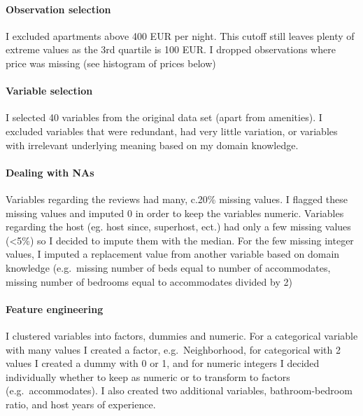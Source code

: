 \documentclass[
]{article}
\begin{document}
\hypertarget{observation-selection}{%
\paragraph{Observation selection}\label{observation-selection}}

I excluded apartments above 400 EUR per night. This cutoff still leaves
plenty of extreme values as the 3rd quartile is 100 EUR. I dropped
observations where price was missing (see histogram of prices below)

\hypertarget{variable-selection}{%
\paragraph{Variable selection}\label{variable-selection}}

I selected 40 variables from the original data set (apart from
amenities). I excluded variables that were redundant, had very little
variation, or variables with irrelevant underlying meaning based on my
domain knowledge.

\hypertarget{dealing-with-nas}{%
\paragraph{Dealing with NAs}\label{dealing-with-nas}}

Variables regarding the reviews had many, c.20\% missing values. I
flagged these missing values and imputed 0 in order to keep the
variables numeric. Variables regarding the host (eg. host since,
superhost, ect.) had only a few missing values (\textless5\%) so I
decided to impute them with the median. For the few missing integer
values, I imputed a replacement value from another variable based on
domain knowledge (e.g.~missing number of beds equal to number of
accommodates, missing number of bedrooms equal to accommodates divided
by 2)

\hypertarget{feature-engineering}{%
\paragraph{Feature engineering}\label{feature-engineering}}

I clustered variables into factors, dummies and numeric. For a
categorical variable with many values I created a factor,
e.g.~Neighborhood, for categorical with 2 values I created a dummy with
0 or 1, and for numeric integers I decided individually whether to keep
as numeric or to transform to factors (e.g.~accommodates). I also
created two additional variables, bathroom-bedroom ratio, and host years
of experience.
\end{document}
